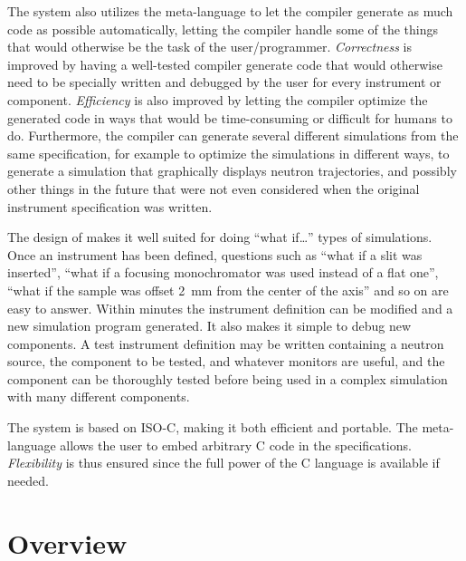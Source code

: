 The \MCS system also utilizes the meta-language to let the \MCS
compiler generate as much code as possible automatically, letting the
compiler handle some of the things that would otherwise be the task of
the user/programmer. \textit{Correctness} is improved by having a well-tested
compiler generate code that would otherwise need to be specially written
and debugged by the user for every instrument or component. \textit{Efficiency}
is also improved by letting the compiler optimize the generated code in
ways that would be time-consuming or difficult for humans to do. Furthermore, the
compiler can generate several different simulations from the same
specification, for example to optimize the simulations in different
ways, to generate a simulation that graphically displays neutron
trajectories, and possibly other things in the future that were not even
considered when the original instrument specification was written.

The design of \MCS makes it well suited for doing ``what if\ldots''
types of simulations. Once an instrument has been defined, questions
such as ``what if a slit was inserted'', ``what if a focusing
monochromator was used instead of a flat one'', ``what if the sample was
offset 2~mm from the center of the axis'' and so on are easy to answer. Within
minutes the instrument definition can be modified and a
new simulation program generated. It also makes it simple to debug new
components. A test instrument definition may be written
containing a neutron source, the component to be tested, and whatever
monitors are useful, and the component can be thoroughly tested before
being used in a complex simulation with many different components.

The \MCS system is based on ISO-C, making it both efficient and
portable. The meta-language allows the user to embed arbitrary C code in
the specifications. \textit{Flexibility} is thus ensured since the full
power of the C language is available if needed.


\section{Overview}


